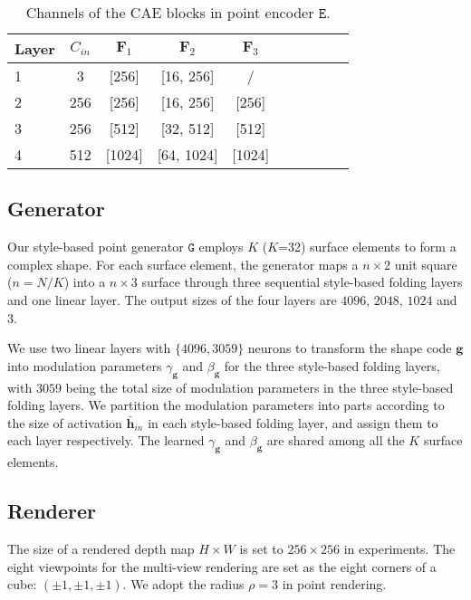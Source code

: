 \documentclass[final]{cvpr}
\begin{document}
\begin{table}[h]
\begin{center}
\footnotesize
\setlength\tabcolsep{1.5pt}
\begin{tabular}{@{}l|cccccccc|c@{}}
\toprule
Layer & $C_{in}$ & $\mathbf{F}_1$ & $\mathbf{F}_2$ & $\mathbf{F}_3$ \\
\midrule
1&3&[256]&[16, 256]&/ \\
2&256&[256]&[16, 256]& [256]\\
3&256&[512]&[32, 512]&[512]\\
4&512&[1024]&[64, 1024]&[1024] \\
\bottomrule
\end{tabular}
\end{center}
\caption{Channels of the CAE blocks in point encoder $\mathtt{E}$.}
\label{table:network_point_encoder}
\end{table}

\subsection{Generator}
Our {style-based point generator} $\mathtt{G}$ employs $K$ ($K$=32) surface elements to form a complex shape. For each surface element, the generator maps a $n \times  2$ unit square  ($n=N/K$) into a $n \times 3$ surface through three sequential style-based folding layers and one linear layer. The output sizes of the four layers are $4096$, $2048$, $1024$ and $3$. 

We use two linear layers with $\{4096, 3059\}$ neurons to transform the shape code $\mathbf{g}$ into modulation parameters $\gamma_{\mathbf{g}}$ and $\beta_{\mathbf{g}}$ for the three style-based folding layers, with $3059$ being the total size of modulation parameters in the three style-based folding layers. We partition the modulation parameters into parts according to the size of activation $\bar{\mathbf{h}}_{in}$ in each style-based folding layer, and assign them to each layer respectively. The learned $\gamma_{\mathbf{g}}$ and $\beta_{\mathbf{g}}$ are shared among all the $K$ surface elements. 

\subsection{Renderer}
The size of a rendered depth map $H\times W$ is set to $256\times 256$ in experiments. 
The eight viewpoints for the multi-view rendering are set as the eight corners of a cube: $(\pm1,\pm1,\pm1)$.
We adopt the radius $\rho=3$ in point rendering.
\end{document}
